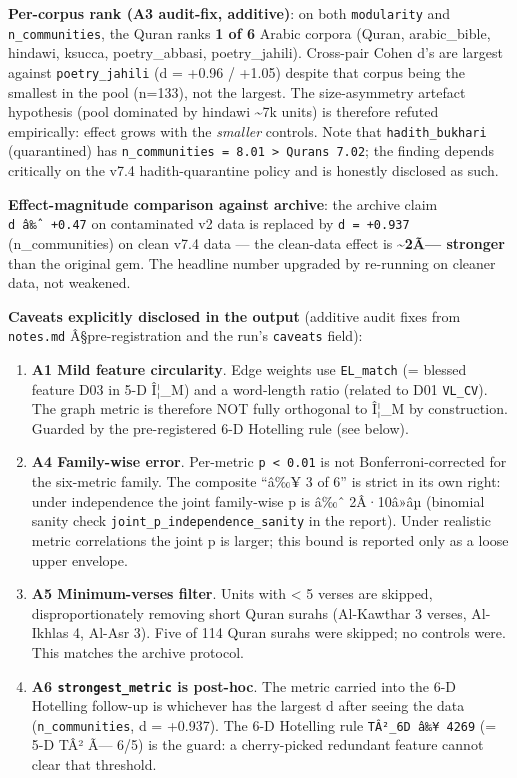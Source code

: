 \documentclass[
]{article}
\begin{document}
\textbf{Per-corpus rank (A3 audit-fix, additive)}: on both
\texttt{modularity} and \texttt{n\_communities}, the Quran ranks
\textbf{1 of 6} Arabic corpora (Quran, arabic\_bible, hindawi, ksucca,
poetry\_abbasi, poetry\_jahili). Cross-pair Cohen d's are largest
against \texttt{poetry\_jahili} (d = +0.96 / +1.05) despite that corpus
being the smallest in the pool (n=133), not the largest. The
size-asymmetry artefact hypothesis (pool dominated by hindawi
\textasciitilde7k units) is therefore refuted empirically: effect grows
with the \emph{smaller} controls. Note that \texttt{hadith\_bukhari}
(quarantined) has
\texttt{n\_communities\ =\ 8.01\ \textgreater{}\ Quran\textquotesingle{}s\ 7.02};
the finding depends critically on the v7.4 hadith-quarantine policy and
is honestly disclosed as such.

\textbf{Effect-magnitude comparison against archive}: the archive claim
\texttt{d\ â‰ˆ\ +0.47} on contaminated v2 data is replaced by
\texttt{d\ =\ +0.937} (n\_communities) on clean v7.4 data --- the
clean-data effect is \textbf{\textasciitilde2Ã--- stronger} than the
original gem. The headline number upgraded by re-running on cleaner
data, not weakened.

\textbf{Caveats explicitly disclosed in the output} (additive audit
fixes from \texttt{notes.md} Â§pre-registration and the run's
\texttt{caveats} field):

\begin{enumerate}
\def\labelenumi{\arabic{enumi}.}
\item
  \textbf{A1 Mild feature circularity}. Edge weights use
  \texttt{EL\_match} (= blessed feature D03 in 5-D Î¦\_M) and a
  word-length ratio (related to D01 \texttt{VL\_CV}). The graph metric
  is therefore NOT fully orthogonal to Î¦\_M by construction. Guarded by
  the pre-registered 6-D Hotelling rule (see below).
\item
  \textbf{A4 Family-wise error}. Per-metric
  \texttt{p\ \textless{}\ 0.01} is not Bonferroni-corrected for the
  six-metric family. The composite ``â‰¥ 3 of 6'' is strict in its own
  right: under independence the joint family-wise p is â‰ˆ 2Â·10â»âµ
  (binomial sanity check \texttt{joint\_p\_independence\_sanity} in the
  report). Under realistic metric correlations the joint p is larger;
  this bound is reported only as a loose upper envelope.
\item
  \textbf{A5 Minimum-verses filter}. Units with \textless{} 5 verses are
  skipped, disproportionately removing short Quran surahs (Al-Kawthar 3
  verses, Al-Ikhlas 4, Al-Asr 3). Five of 114 Quran surahs were skipped;
  no controls were. This matches the archive protocol.
\item
  \textbf{A6 \texttt{strongest\_metric} is post-hoc}. The metric carried
  into the 6-D Hotelling follow-up is whichever has the largest
  \textbar d\textbar{} after seeing the data (\texttt{n\_communities}, d
  = +0.937). The 6-D Hotelling rule \texttt{TÂ²\_6D\ â‰¥\ 4269} (= 5-D
  TÂ² Ã--- 6/5) is the guard: a cherry-picked redundant feature cannot
  clear that threshold.
\end{enumerate}
\end{document}

